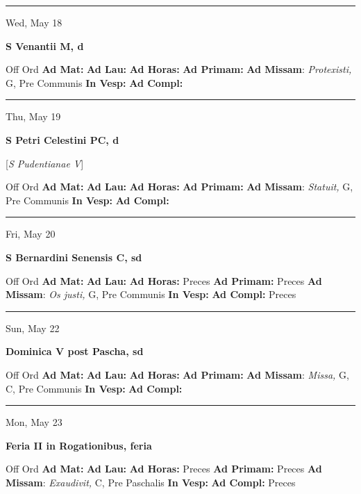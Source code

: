 \documentclass[letterpaper, 10pt]{article}
\begin{document}
\hrule
\begin{center}
Wed, May 18
\end{center}\textbf{ \large S Venantii M, \textnormal{\normalsize d}}
\begin{justify}
Off Ord
\textbf{Ad Mat: }
\textbf{Ad Lau: }
\textbf{Ad Horas: }
\textbf{Ad Primam: }
\textbf{Ad Missam}: \textit{Protexisti,} G, Pre Communis
\textbf{In Vesp: }
\textbf{Ad Compl: }\end{justify}



\hrule
\begin{center}
Thu, May 19
\end{center}\textbf{ \large S Petri Celestini PC, \textnormal{\normalsize d}}

[\textit{S Pudentianae V}]
\begin{justify}
Off Ord
\textbf{Ad Mat: }
\textbf{Ad Lau: }
\textbf{Ad Horas: }
\textbf{Ad Primam: }
\textbf{Ad Missam}: \textit{Statuit,} G, Pre Communis
\textbf{In Vesp: }
\textbf{Ad Compl: }\end{justify}



\hrule
\begin{center}
Fri, May 20
\end{center}\textbf{ \large S Bernardini Senensis C, \textnormal{\normalsize sd}}
\begin{justify}
Off Ord
\textbf{Ad Mat: }
\textbf{Ad Lau: }
\textbf{Ad Horas: }Preces
\textbf{Ad Primam: }Preces
\textbf{Ad Missam}: \textit{Os justi,} G, Pre Communis
\textbf{In Vesp: }
\textbf{Ad Compl: }Preces\end{justify}



\hrule
\begin{center}
Sun, May 22
\end{center}\textbf{ \large Dominica V post Pascha, \textnormal{\normalsize sd}}
\begin{justify}
Off Ord
\textbf{Ad Mat: }
\textbf{Ad Lau: }
\textbf{Ad Horas: }
\textbf{Ad Primam: }
\textbf{Ad Missam}: \textit{Missa,} G, C, Pre Communis
\textbf{In Vesp: }
\textbf{Ad Compl: }\end{justify}



\hrule
\begin{center}
Mon, May 23
\end{center}\textbf{ \large Feria II in Rogationibus, \textnormal{\normalsize feria}}
\begin{justify}
Off Ord
\textbf{Ad Mat: }
\textbf{Ad Lau: }
\textbf{Ad Horas: }Preces
\textbf{Ad Primam: }Preces
\textbf{Ad Missam}: \textit{Exaudivit,} C, Pre Paschalis
\textbf{In Vesp: }
\textbf{Ad Compl: }Preces\end{justify}
\end{document}
